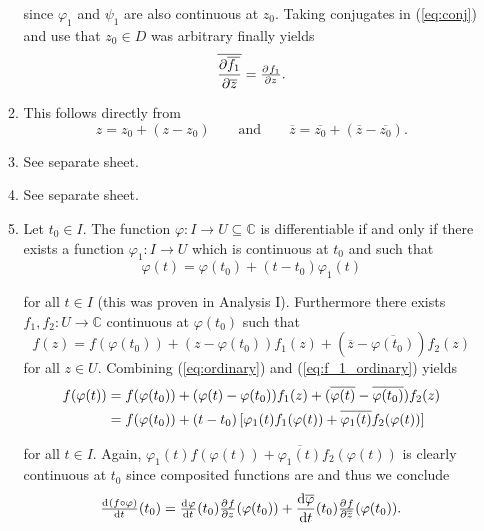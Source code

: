 \begin{enumerate}[label = \textbf{Exercise \arabic*.},wide = 0pt, itemsep=1.5ex]
\begin{enumerate}[label = (\roman*),wide = 0pt, itemsep=1.5ex]
				\noindent since $\varphi_1$ and $\psi_1$ are also continuous at $z_0$. Taking conjugates in (\ref{eq:conj}) and use that $z_0 \in D$ was arbitrary finally yields
				\begin{equation}
					\overline{\frac{\partial\overline{f_1}}{\partial\overline{z}}} = \pd{f_1}{z}.
				\end{equation}

			\item This follows directly from
				\begin{equation}
					z = z_0 + (z - z_0) \qquad \text{and} \qquad \overline{z} = \overline{z_0} + (\overline{z} - \overline{z_0}).
				\end{equation}

			\item See separate sheet.
			\item See separate sheet.
			\item Let $t_0 \in I$. The function $\varphi: I \to U \subseteq \mathbb{C}$ is differentiable if and only if there exists a function $\varphi_1: I \to U$ which is continuous at $t_0$ and such that
				\begin{equation}
					\varphi(t) = \varphi(t_0) + (t - t_0)\varphi_1(t)
					\label{eq:ordinary}
				\end{equation}

				\noindent for all $t \in I$ (this was proven in Analysis I). Furthermore there exists $f_1,f_2: U \to \mathbb{C}$ continuous at $\varphi(t_0)$ such that 
				\begin{equation}
					f(z) = f(\varphi(t_0)) + (z - \varphi(t_0))f_1(z) + (\overline{z} - \overline{\varphi(t_0)})f_2(z)
					\label{eq:f_1_ordinary}
				\end{equation}
				\noindent for all $z \in U$. Combining (\ref{eq:ordinary}) and (\ref{eq:f_1_ordinary}) yields
				\begin{align*}
					f(\varphi(t)) &= f(\varphi(t_0)) + (\varphi(t) - \varphi(t_0))f_1(z) + (\overline{\varphi(t)} - \overline{\varphi(t_0)})f_2(z)\\
					&= f(\varphi(t_0)) + (t - t_0)\sbr[0]{\varphi_1(t)f_1(\varphi(t)) + \overline{\varphi_1(t)}f_2(\varphi(t))}
				\end{align*}

				\noindent for all $t \in I$. Again, $\varphi_1(t)f(\varphi(t)) + \overline{\varphi_1(t)}f_2(\varphi(t))$ is clearly continuous at $t_0$ since composited functions are and thus we conclude
				\begin{equation}
					\od{(f \circ \varphi)}{t}(t_0) = \od{\varphi}{t}(t_0)\pd{f}{z}(\varphi(t_0)) + \frac{\d \overline{\varphi}}{\d t}(t_0)\pd{f}{\overline{z}}(\varphi(t_0)).
				\end{equation}


\end{enumerate}
\end{enumerate}
